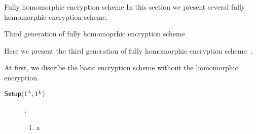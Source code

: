 % 
% 
% 
% 
\begin{section}{Fully homomorphic encryption scheme}
  In this section we present several fully homomorphic encryption scheme.

  \begin{subsection}{Third generation of fully homomoprhic encryption scheme}

    Here we present the third generation of fully homomorphic encryption scheme~\cite{DBLP:conf/crypto/GentrySW13}.
    
    At first, we discribe the basic encryption scheme without the homomorphic encryption.

    \begin{description}
    \item[$\boldmath{{\mathsf{Setup}}(1^\lambda, 1^L)}$]:
      \begin{enumerate}
      \item a
      \end{enumerate}
      
    \end{description}
  \end{subsection}

\end{section}

